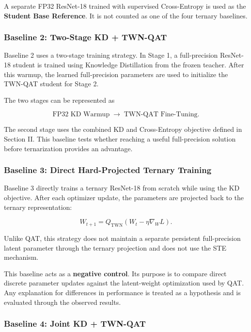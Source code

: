 \documentclass[conference]{IEEEtran}
\begin{document}
A separate FP32 ResNet-18 trained with supervised Cross-Entropy is used
as the \textbf{Student Base Reference}. It is not counted as one of the
four ternary baselines.

\subsubsection{Baseline 2: Two-Stage KD + TWN-QAT}

Baseline 2 uses a two-stage training strategy. In Stage 1, a
full-precision ResNet-18 student is trained using Knowledge
Distillation from the frozen teacher. After this warmup, the learned
full-precision parameters are used to initialize the TWN-QAT student
for Stage 2.

The two stages can be represented as

\begin{equation}
\text{FP32 KD Warmup}
\;\longrightarrow\;
\text{TWN-QAT Fine-Tuning}.
\end{equation}

The second stage uses the combined KD and Cross-Entropy objective
defined in Section II. This baseline tests whether reaching a useful
full-precision solution before ternarization provides an advantage.

\subsubsection{Baseline 3: Direct Hard-Projected Ternary Training}

Baseline 3 directly trains a ternary ResNet-18 from scratch while
using the KD objective. After each optimizer update, the parameters are
projected back to the ternary representation:

\begin{equation}
W_{t+1}
=
Q_{\mathrm{TWN}}
\left(
W_t-\eta\nabla_W L
\right).
\end{equation}

Unlike QAT, this strategy does not maintain a separate persistent
full-precision latent parameter through the ternary projection and
does not use the STE mechanism.

This baseline acts as a \textbf{negative control}. Its purpose is to
compare direct discrete parameter updates against the latent-weight
optimization used by QAT. Any explanation for differences in
performance is treated as a hypothesis and is evaluated through the
observed results.

\subsubsection{Baseline 4: Joint KD + TWN-QAT}
\end{document}
